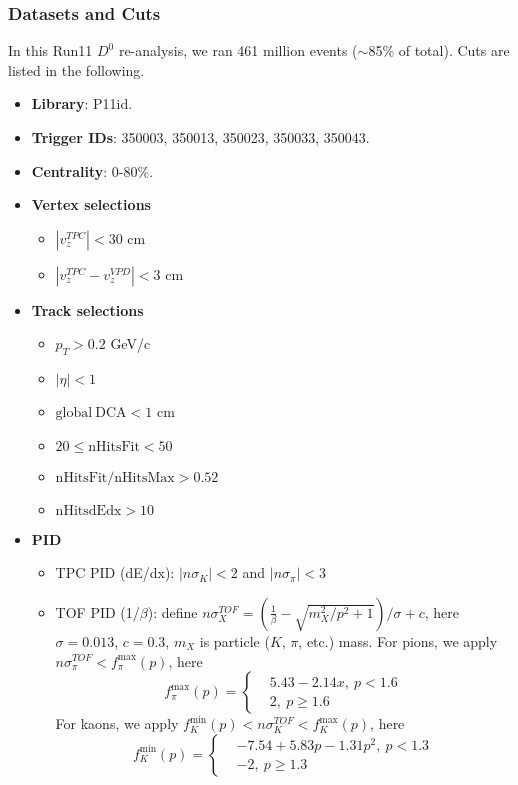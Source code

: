 \subsubsection{Datasets and Cuts}
In this Run11 $D^0$ re-analysis, we ran 461 million events ($\sim$85\% of total). Cuts are listed in the following.
\begin{itemize}
\item \textbf{Library}: P11id.

\item \textbf{Trigger IDs}:  350003, 350013, 350023, 350033, 350043.

\item \textbf{Centrality}: 0-80\%.

\item \textbf{Vertex selections}
\begin{itemize}
\item $|v_z^{TPC}| < 30$ cm
\item $|v_z^{TPC} - v_z^{VPD}| < 3$ cm
\end{itemize}

\item \textbf{Track selections}
\begin{itemize}
\item $p_T > 0.2$ GeV/c
\item $|\eta| < 1$
\item $\mathrm{global ~ DCA} < 1$ cm
\item $20 \leq \mathrm{nHitsFit} < 50$
\item $\mathrm{nHitsFit}/\mathrm{nHitsMax} > 0.52$
\item $\mathrm{nHitsdEdx} > 10$
\end{itemize}

\item \textbf{PID}
\begin{itemize}
\item TPC PID (dE/dx): $|n\sigma_K| < 2$ and $|n\sigma_\pi| < 3$
\item TOF PID (1/$\beta$): define $n\sigma_X^{TOF} = ( \frac{1}{\beta} - \sqrt{m_X^2/p^2 + 1} )/\sigma + c$, here $\sigma = 0.013$, $c = 0.3$,  $m_X$ is particle ($K$, $\pi$, etc.) mass. For pions, we apply $n\sigma_\pi^{TOF} < f_\pi^{\mathrm{max}}(p)$, here
\begin{equation}
f_\pi^{\mathrm{max}}(p) = \left\{
\begin{aligned}
&5.43 - 2.14x, ~ p < 1.6  \\
&2, ~ p \geq 1.6
\end{aligned}
\right.
\label{eq:nsigTofPi}
\end{equation}
For kaons, we apply $f_K^{\mathrm{min}}(p) < n\sigma_K^{TOF} < f_K^{\mathrm{max}}(p)$, here
\begin{equation}
f_K^{\mathrm{min}}(p) = \left\{
\begin{aligned}
&-7.54 + 5.83p - 1.31p^2, ~ p < 1.3  \\
&-2, ~ p \geq 1.3
\end{aligned}
\right.
\label{eq:nsigTofK1}
\end{equation}


\end{itemize}
\end{itemize}
